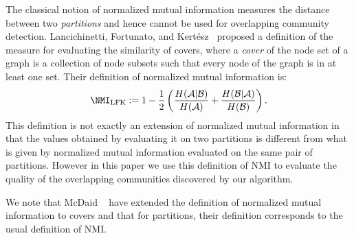 The classical notion of normalized mutual information measures the distance  between 
two \emph{partitions} and hence cannot be used for overlapping community detection. 
Lancichinetti, Fortunato, and Kert\'{e}sz~\cite{LFK09} proposed a definition of the measure for 
evaluating the similarity of covers, where a \emph{cover} of the node set of a graph 
is a collection of node subsets such that every node of the graph is in at least one set. 
Their definition of normalized mutual information is:
\begin{equation} \label{eqn:nmi_LFK}
\NMI_{\mathrm{LFK}} := 1 - \frac{1}{2} 
		\left ( \frac{H(\mathcal{A} | \mathcal{B})}{H(\mathcal{A})} + \frac{H(\mathcal{B}
				| \mathcal{A})}{H(\mathcal{B})}\right ).
\end{equation}
This definition is not exactly an extension of normalized mutual information in that the values
obtained by evaluating it on two partitions is different from what is given by normalized mutual 
information evaluated on the same pair of partitions. However in this paper we use this definition 
of NMI to evaluate the quality of the overlapping communities discovered by our algorithm. 

We note that McDaid \etal~\cite{MGH11} have extended the definition of normalized mutual 
information to covers and that for partitions, their definition corresponds to the usual definition of NMI. 

